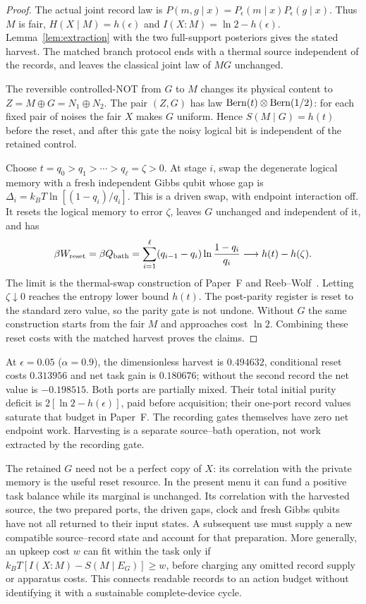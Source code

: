 \documentclass[12pt]{article}
\begin{document}
\begin{proof}
The actual joint record law is
$P(m,g\mid x)=P_\epsilon(m\mid x)P_\epsilon(g\mid x)$.
Thus $M$ is fair,
$H(X\mid M)=h(\epsilon)$ and
$I(X{:}M)=\ln2-h(\epsilon)$.
Lemma~\ref{lem:extraction} with the two full-support posteriors gives the stated harvest. The matched branch protocol ends with a thermal source independent of the records, and leaves the classical joint law of $MG$ unchanged.

The reversible controlled-NOT from $G$ to $M$ changes its physical content to
$Z=M\oplus G=N_1\oplus N_2$.
The pair $(Z,G)$ has law
$ {\rm Bern}(t)\otimes{\rm Bern}(1/2)$: for each fixed pair of noises the fair $X$ makes $G$ uniform. Hence $S(M\mid G)=h(t)$ before the reset, and after this gate the noisy logical bit is independent of the retained control.

Choose $t=q_0>q_1>\cdots>q_\ell=\zeta>0$. At stage $i$, swap the degenerate logical memory with a fresh independent Gibbs qubit whose gap is
$\Delta_i=k_BT\ln[(1-q_i)/q_i]$.
This is a driven swap, with endpoint interaction off. It resets the logical memory to error $\zeta$, leaves $G$ unchanged and independent of it, and has
\[
 \beta W_{\rm reset}
 =\beta Q_{\rm bath}
 =\sum_{i=1}^{\ell}(q_{i-1}-q_i)
      \ln\frac{1-q_i}{q_i}
 \longrightarrow h(t)-h(\zeta).
\]
The limit is the thermal-swap construction of Paper~F and Reeb--Wolf~\cite{Liu2026HAFF_F,ReebWolf2014}. Letting $\zeta\downarrow0$ reaches the entropy lower bound $h(t)$. The post-parity register is reset to the standard zero value, so the parity gate is not undone. Without $G$ the same construction starts from the fair $M$ and approaches cost $\ln2$. Combining these reset costs with the matched harvest proves the claims.
\end{proof}

At $\epsilon=0.05$ ($\alpha=0.9$), the dimensionless harvest is
$0.494632$, conditional reset costs $0.313956$ and net task gain is
$0.180676$; without the second record the net value is $-0.198515$.
Both ports are partially mixed. Their total initial purity deficit is
$2[\ln2-h(\epsilon)]$, paid before acquisition; their one-port record values saturate that budget in Paper~F. The recording gates themselves have zero net endpoint work. Harvesting is a separate source--bath operation, not work extracted by the recording gate.

The retained $G$ need not be a perfect copy of $X$: its correlation with the private memory is the useful reset resource. In the present menu it can fund a positive task balance while its marginal is unchanged. Its correlation with the harvested source, the two prepared ports, the driven gaps, clock and fresh Gibbs qubits have not all returned to their input states. A subsequent use must supply a new compatible source--record state and account for that preparation. More generally, an upkeep cost $w$ can fit within the task only if
$k_BT[I(X{:}M)-S(M\mid E_G)]\ge w$, before charging any omitted record supply or apparatus costs. This connects readable records to an action budget without identifying it with a sustainable complete-device cycle.
\end{document}
